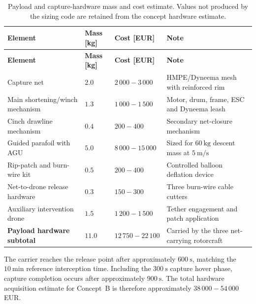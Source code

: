 {
\small
\setlength{\LTleft}{0pt}
\setlength{\LTright}{0pt}
\setlength{\tabcolsep}{4pt}

\begin{longtable}{@{}
>{\raggedright\arraybackslash}p{}
>{\raggedleft\arraybackslash}p{}
>{\raggedleft\arraybackslash}p{}
>{\raggedright\arraybackslash}p{}
@{}}
\caption{Payload and capture-hardware mass and cost estimate. Values not produced by the sizing code are retained from the concept hardware estimate.}
\label{tab:conceptB_payload_compact} \\
\hline
\textbf{Element} & \textbf{Mass [kg]} & \textbf{Cost [EUR]} & \textbf{Note} \\
\hline
\endfirsthead

\hline
\textbf{Element} & \textbf{Mass [kg]} & \textbf{Cost [EUR]} & \textbf{Note} \\
\hline
\endhead

\hline
\endfoot

Capture net & $2.0$ & $2\,000-3\,000$ & HMPE/Dyneema mesh with reinforced rim \\
Main shortening/winch mechanism & $1.3$ & $1\,000-1\,500$ & Motor, drum, frame, ESC and Dyneema leash \\
Cinch drawline mechanism & $0.4$ & $200-400$ & Secondary net-closure mechanism \\
Guided parafoil with AGU & $5.0$ & $8\,000-15\,000$ & Sized for $60~\mathrm{kg}$ descent mass at $5~\mathrm{m/s}$ \\
Rip-patch and burn-wire kit & $0.5$ & $200-400$ & Controlled balloon deflation device \\
Net-to-drone release hardware & $0.3$ & $150-300$ & Three burn-wire cable cutters \\
Auxiliary intervention drone & $1.5$ & $1\,200-1\,500$ & Tether engagement and patch application \\
\textbf{Payload hardware subtotal} & \textbf{$11.0$} & \textbf{$12\,750-22\,100$} & Carried by the three net-carrying rotorcraft \\

\end{longtable}
}
The carrier reaches the release point after approximately $600~\mathrm{s}$, matching the $10~\mathrm{min}$ reference interception time. Including the $300~\mathrm{s}$ capture hover phase, capture completion occurs after approximately $900~\mathrm{s}$. The total hardware acquisition estimate for Concept~B is therefore approximately $38\,000-54\,000$ EUR.



